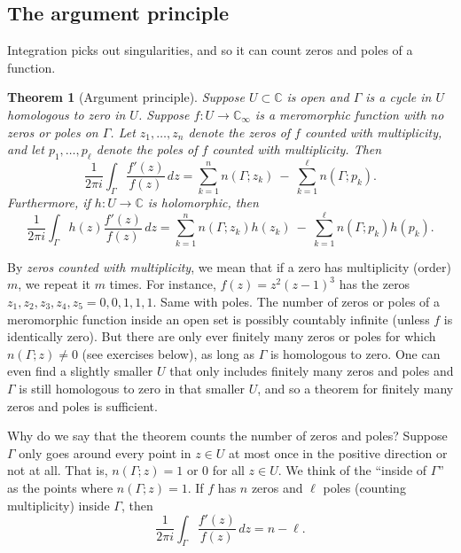 \documentclass[12pt,openany]{book}
\newcommand{\C}{{\mathbb{C}}}
\newcommand{\myindex}[1]{#1\index{#1}}
\newcommand{\myquote}[1]{``#1''}
\theoremstyle{plain}
\newtheorem{thm}{Theorem}[section]
\theoremstyle{remark}
\theoremstyle{definition}
\theoremstyle{exercise}
\theoremstyle{example}
\begin{document}
\subsection{The argument principle}

Integration picks out singularities, and so it can count zeros and
poles of a function.

\begin{thm}[Argument principle]\label{thm:argprinc}
\pagebreak[2]
Suppose $U \subset \C$ is open and $\Gamma$ is a cycle in $U$
homologous to zero in $U$.
Suppose $f \colon U \to \C_\infty$ is a meromorphic function with no zeros
or poles on $\Gamma$.
Let 
$z_1,\ldots,z_n$ denote the 
zeros of $f$ counted with multiplicity,
and let $p_1,\ldots,p_\ell$ denote the poles of $f$ counted with multiplicity.
Then
\begin{equation*}
\frac{1}{2\pi i}
\int_\Gamma \frac{f'(z)}{f(z)} \, dz
=
\sum_{k=1}^n n(\Gamma;z_k)
~
-
~
\sum_{k=1}^\ell n(\Gamma;p_k) .
\end{equation*}
Furthermore, if $h \colon U \to \C$ is holomorphic, then
\begin{equation*}
\frac{1}{2\pi i}
\int_\Gamma h(z) \frac{f'(z)}{f(z)} \, dz
=
\sum_{k=1}^n n(\Gamma;z_k)h(z_k) 
~
-
~
\sum_{k=1}^\ell n(\Gamma;p_k)h(p_k) .
\end{equation*}
\end{thm}

By
\emph{\myindex{zeros counted with multiplicity}},
we mean that if
a zero has multiplicity (order) $m$, we repeat it $m$ times.
For instance, $f(z) = z^2{(z-1)}^3$ has the zeros $z_1,z_2,z_3,z_4,z_5 = 0,0,1,1,1$.
Same with poles.
The number of zeros or poles of a meromorphic function
inside an open set is possibly countably
infinite (unless $f$ is identically zero).
But there are only ever finitely
many zeros or poles for which 
$n(\Gamma;z) \not= 0$ (see exercises below), as long as $\Gamma$ is
homologous to zero.  One can even find a slightly smaller $U$ that only
includes finitely many zeros and poles and $\Gamma$ is still homologous to
zero in that smaller $U$, and so a theorem for finitely many zeros and poles is
sufficient.

Why do we say that the theorem counts the number of zeros and poles?
Suppose $\Gamma$ only goes around every point in $z \in U$ at most once
in the positive direction or not at all.  That is,
$n(\Gamma;z) = 1$ or $0$ for all $z \in U$.  We think of the
\myquote{inside of $\Gamma$} as the points where $n(\Gamma;z)=1$.
If $f$ has $n$ zeros and $\ell$ poles (counting multiplicity)
inside $\Gamma$, then
\begin{equation*}
\frac{1}{2\pi i}
\int_\Gamma \frac{f'(z)}{f(z)} \, dz
= n - \ell .
\end{equation*}
\end{document}
